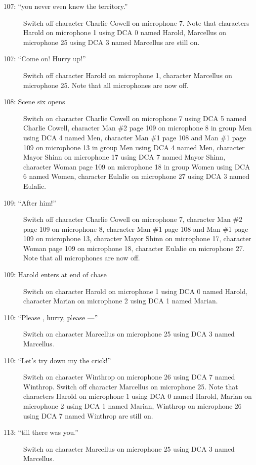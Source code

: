 \begin{description}
\item[107: ``you never even knew the territory.'']
Switch off character Charlie Cowell on microphone 7. Note that characters Harold on microphone 1 using DCA 0 named Harold, Marcellus on microphone 25 using DCA 3 named Marcellus are still on.  

\item[107: ``Come on! Hurry up!'']
Switch off character Harold on microphone 1, character Marcellus on microphone 25. Note that all microphones are now off.

\item[108: Scene six opens]
Switch on character Charlie Cowell on microphone 7 using DCA 5 named Charlie Cowell, character Man \#2 page 109 on microphone 8 in group Men using DCA 4 named Men, character Man \#1 page 108 and Man \#1 page 109 on microphone 13 in group Men using DCA 4 named Men, character Mayor Shinn on microphone 17 using DCA 7 named Mayor Shinn, character Woman page 109 on microphone 18 in group Women using DCA 6 named Women, character Eulalie on microphone 27 using DCA 3 named Eulalie. 

\item[109: ``After him!'']
Switch off character Charlie Cowell on microphone 7, character Man \#2 page 109 on microphone 8, character Man \#1 page 108 and Man \#1 page 109 on microphone 13, character Mayor Shinn on microphone 17, character Woman page 109 on microphone 18, character Eulalie on microphone 27. Note that all microphones are now off.

\item[109: Harold enters at end of chase]
Switch on character Harold on microphone 1 using DCA 0 named Harold, character Marian on microphone 2 using DCA 1 named Marian. 

\item[110: ``Please , hurry, please ---'']
Switch on character Marcellus on microphone 25 using DCA 3 named Marcellus. 

\item[110: ``Let's try down my the crick!'']
Switch on character Winthrop on microphone 26 using DCA 7 named Winthrop. Switch off character Marcellus on microphone 25. Note that characters Harold on microphone 1 using DCA 0 named Harold, Marian on microphone 2 using DCA 1 named Marian, Winthrop on microphone 26 using DCA 7 named Winthrop are still on.  

\item[113: ``till there was you.'']
Switch on character Marcellus on microphone 25 using DCA 3 named Marcellus. 


\end{description}
